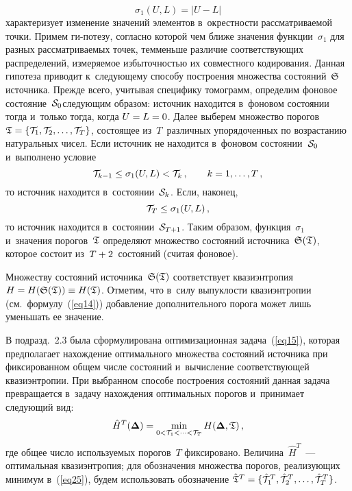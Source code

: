 \begin{multicols}{2}
\noindent
\begin{equation}
\label{eq22}
\sigma_1(U,L)=|U-L|
\end{equation}
характеризует изменение значений элементов в~окрестности рассматриваемой точки. 
Примем ги-\linebreak потезу, согласно которой чем ближе значения функции~$\sigma_1$ 
для разных рассматриваемых точек, тем\linebreak меньше различие соответствующих 
распределений, измеряемое избыточностью их совместного кодирования. Данная 
гипотеза приводит к~сле\-ду\-юще\-му способу построения множества состояний~$\frak S$ 
источника. Прежде всего, учитывая специфику томограмм, определим фоновое 
состояние~${\cal S}_0$\linebreak   следующим образом: источник находится в~фоновом 
состоянии тогда и~только тогда, когда $U\hm=L\hm=0$. Далее выберем множество 
порогов ${\frak T}\hm=\{{\cal T}_1,{\cal T}_2,\dots,{\cal T}_T \}$, состоящее 
из~$T$~различных упорядочен\-ных по возрастанию натуральных чисел. Если источник 
не находится в~фоновом состоянии~${\cal S}_0$ и~выполнено условие
\begin{equation}
\label{eq23}
{\cal T}_{k-1} \leq \sigma_1(U,L) < {\cal T}_{k}\,, \qquad k=1,\dots,T\,,
\end{equation}
то источник находится в~состоянии~${\cal S}_k$. Если, наконец,
\begin{equation}
\label{eq24}
{\cal T}_{T} \leq \sigma_1(U,L)\,,
\end{equation}
то источник находится в~состоянии~${\cal S}_{T+1}$. Таким образом, 
функция~$\sigma_1$ и~значения порогов~$\frak T$ определяют множество 
состояний источника~${\frak S}({\frak T})$, которое состоит из~$T\hm+2$~состояний 
(считая фоновое).

Множеству состояний источника~${\frak S}(\frak T)$ соответствует квазиэнтропия 
$H\hm=H({\frak S}({\frak T}))\hm\equiv H({\frak T})$. 
Отметим, что в~силу выпуклости квазиэнтропии (см.\ формулу~(\ref{eq14})) 
добавление дополнительного порога может лишь уменьшать ее значение.

В подразд.~2.3 была сформулирована оптимизационная задача~(\ref{eq15}), 
которая предполагает нахож\-де\-ние оптимального множества со\-сто\-яний источника 
при фиксированном общем числе со\-сто\-яний и~вычисление соответствующей 
квазиэнтропии. При выбранном способе построения со\-сто\-яний данная задача 
превращается в~задачу нахождения оптимальных порогов и~принимает следующий вид:
\begin{equation}
\label{eq25}
\hat{H}^{T}(\boldsymbol{\Delta}) =
\min\limits_{0<{\cal T}_1<\dots<{\cal T}_T}  H(\boldsymbol{\Delta},{\frak T})\,,
\end{equation}
где общее число используемых порогов~$T$ фиксировано. Величина~$\hat{H}^{T}$~--- 
оптимальная квазиэнтропия; для обозначения множества порогов, реализующих минимум 
в~(\ref{eq25}), будем использовать обозначение $\hat{\frak T}^T\hm=
\{{\hat{\cal T}}^{T}_{1}, {\hat{\cal T}}^{T}_{2},\dots, {\hat{\cal T}}^{T}_{T}\}$.


\end{multicols}
